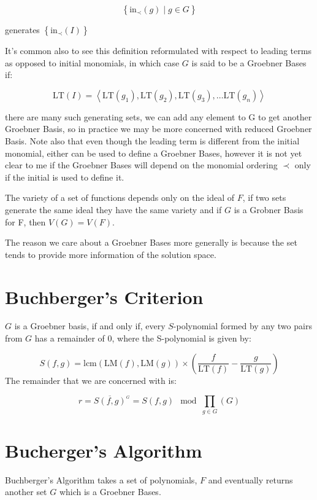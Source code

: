 \documentclass[a4paper,11pt,twoside]{article}
\begin{document}
\[
    \left\{ \mathrm{in}_{\prec}\left(g\right)\mid g\in G\right\} 
    \]

generates \(\left\{ \mathrm{in}_{\prec}\left(I\right)\right\}\)

It's common also to see this definition reformulated with respect
to leading terms as opposed to initial monomials, in which case
\(G\) is said to be a Groebner Bases if: \cite[2.5]{coxIdealsVarietiesAlgorithms1997}

\[
    \mathrm{LT}\left(I\right)=\left\langle \mathrm{LT}\left(g_{1}\right),\mathrm{LT}\left(g_{2}\right),\mathrm{LT}\left(g_{3}\right),\ldots\mathrm{LT}\left(g_{n}\right)\right\rangle 
    \]

there are many such generating sets, we can add any element to G
to get another Groebner Basis, so in practice we may be more
concerned with reduced Groebner Basis. Note also that even though
the leading term is different from the initial monomial, either
can be used to define a Groebner Bases, however it is not yet
clear to me if the Groebner Bases will depend on the monomial
ordering \(\prec\) only if the initial is used to define it.

The variety of a set of functions depends only on the ideal of
\(F\), if two sets generate the same ideal they have the same
variety and if \(G\) is
a Grobner Basis for F, then \(V(G)=V(F)\). 

The reason we care about a Groebner Bases more generally is
because the set tends to provide more information of the solution space.

\section{Buchberger's Criterion}
\label{sec:orgb4fdca1}
\(G\) is a Groebner basis, if and only if, every \(S\)-polynomial
formed by any two pairs from \(G\) has a remainder of 0, where
the S-polynomial is given by: \cite[\S 2.6]{coxIdealsVarietiesAlgorithms1997}

\[
    S\left(f,g\right)=\mathrm{lcm}\left(\mathrm{LM}\left(f\right),\mathrm{LM}\left(g\right)\right)\times\left(\frac{f}{\mathrm{LT}\left(f\right)}-\frac{g}{\mathrm{LT}\left(g\right)}\right)
    \]
The remainder that we are concerned with is:

\[
    r = {\overline{S(f,g)}^{_G}} = S(f,g) \mod \prod_{g\in G} \left(G \right)
    \]
\section{Bucherger's Algorithm}
\label{sec:org5742e82}
Buchberger's Algorithm takes a set of polynomials, \(F\) and
eventually returns another set \(G\) which is a Groebner Bases.
\end{document}
